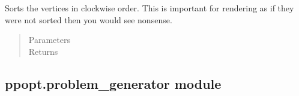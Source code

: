 \documentclass[letterpaper,10pt,english]{sphinxmanual}
\begin{document}
\begin{fulllineitems}
\label{\detokenize{ppopt:ppopt.plot.sort_clockwise}}
\sphinxAtStartPar
Sorts the vertices in clockwise order. This is important for rendering as if they were not sorted then you would see nonsense.
\begin{quote}\begin{description}
\item[{Parameters}] \leavevmode
\sphinxAtStartPar
{} \textendash{} 

\item[{Returns}] \leavevmode
\sphinxAtStartPar


\end{description}\end{quote}

\end{fulllineitems}



\subsection{ppopt.problem\_generator module}
\label{\detokenize{ppopt:module-ppopt.problem_generator}}\label{\detokenize{ppopt:ppopt-problem-generator-module}}
\end{document}
